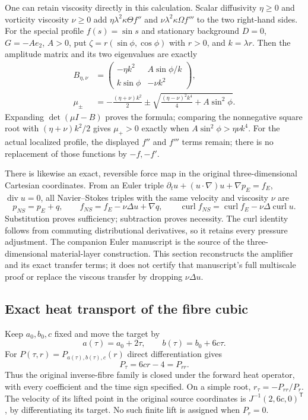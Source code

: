 One can retain viscosity directly in this calculation. Scalar
diffusivity $\eta\ge0$ and vorticity viscosity $\nu\ge0$ add
$\eta\lambda^2\kappa\Theta f''$ and
$\nu\lambda^2\kappa\Omega f'''$ to the two right-hand sides.
For the special profile $f(s)=\sin s$ and stationary background
$D=0$, $G=-Ae_2$, $A>0$, put
$\zeta=r(\sin\phi,\cos\phi)$ with $r>0$, and $k=\lambda r$.
Then the amplitude matrix and its two eigenvalues are exactly
\begin{align*}
 B_{\eta,\nu}&=\begin{pmatrix}
 -\eta k^2&A\sin\phi/k\\k\sin\phi&-\nu k^2
 \end{pmatrix},\\
 \mu_\pm&=-\frac{(\eta+\nu)k^2}{2}
 \mathbin{\pm}\sqrt{\frac{(\eta-\nu)^2k^4}{4}+A\sin^2\phi}.
\end{align*}
Expanding $\det(\mu I-B)$ proves the formula; comparing the
nonnegative square root with $(\eta+\nu)k^2/2$ gives
$\mu_+>0$ exactly when $A\sin^2\phi>\eta\nu k^4$.
For the actual localized profile, the displayed $f''$ and $f'''$
terms remain; there is no replacement of those functions by $-f,-f'$.

There is likewise an exact, reversible force map in the original
three-dimensional Cartesian coordinates. From an Euler triple
$\partial_tu+(u\cdot\nabla)u+\nabla p_E=f_E$, $\operatorname{div}u=0$,
all Navier--Stokes triples with the same velocity and viscosity $\nu$
are
\[
 p_{NS}=p_E+q,\qquad f_{NS}=f_E-\nu\Delta u+\nabla q,
 \qquad \operatorname{curl}f_{NS}
   =\operatorname{curl}f_E-\nu\Delta\operatorname{curl}u.
\]
Substitution proves sufficiency; subtraction proves necessity.
The curl identity follows from commuting distributional derivatives,
so it retains every pressure adjustment. The companion Euler
manuscript\cite[Theorem~1.1 and Sections~3--4]{ab2026euler}
is the source of the three-dimensional material-layer construction.
This section reconstructs the amplifier and its exact transfer terms;
it does not certify that manuscript's full multiscale proof or replace
the viscous transfer by dropping $\nu\Delta u$.

\subsection{Exact heat transport of the fibre cubic}
Keep $a_0,b_0,c$ fixed and move the target by
\begin{equation}
 a(\tau)=a_0+2\tau,\qquad b(\tau)=b_0+6c\tau.
 \label{eq:retained-coefficient-flow}
\end{equation}
For $P(\tau,r)=P_{a(\tau),b(\tau),c}(r)$ direct differentiation gives
\begin{equation}
 P_\tau=6cr-4=P_{rr}.
 \label{eq:retained-heat}
\end{equation}
Thus the original inverse-fibre family is closed under the forward
heat operator, with every coefficient and the time sign specified.
On a simple root, $r_\tau=-P_{rr}/P_r$. The velocity of its lifted
point in the original source coordinates is
$J^{-1}(2,6c,0)^{\mathsf T}$, by differentiating its target.
No such finite lift is assigned when $P_r=0$.

